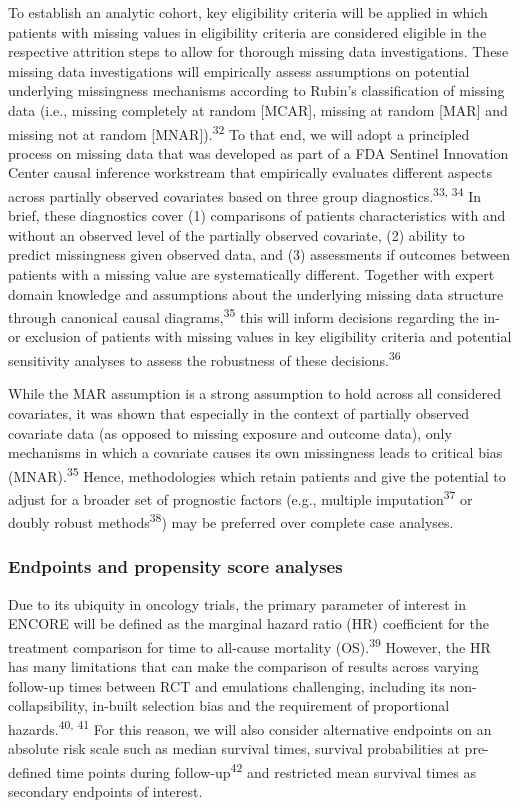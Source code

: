 \documentclass[
  letterpaper,
  DIV=11,
  numbers=noendperiod]{scrartcl}
\begin{document}
To establish an analytic cohort, key eligibility criteria will be
applied in which patients with missing values in eligibility criteria
are considered eligible in the respective attrition steps to allow for
thorough missing data investigations. These missing data investigations
will empirically assess assumptions on potential underlying missingness
mechanisms according to Rubin's classification of missing data (i.e.,
missing completely at random {[}MCAR{]}, missing at random {[}MAR{]} and
missing not at random {[}MNAR{]}).\textsuperscript{32} To that end, we
will adopt a principled process on missing data that was developed as
part of a FDA Sentinel Innovation Center causal inference workstream
that empirically evaluates different aspects across partially observed
covariates based on three group diagnostics.\textsuperscript{33, 34} In
brief, these diagnostics cover (1) comparisons of patients
characteristics with and without an observed level of the partially
observed covariate, (2) ability to predict missingness given observed
data, and (3) assessments if outcomes between patients with a missing
value are systematically different. Together with expert domain
knowledge and assumptions about the underlying missing data structure
through canonical causal diagrams,\textsuperscript{35} this will inform
decisions regarding the in- or exclusion of patients with missing values
in key eligibility criteria and potential sensitivity analyses to assess
the robustness of these decisions.\textsuperscript{36}

While the MAR assumption is a strong assumption to hold across all
considered covariates, it was shown that especially in the context of
partially observed covariate data (as opposed to missing exposure and
outcome data), only mechanisms in which a covariate causes its own
missingness leads to critical bias (MNAR).\textsuperscript{35} Hence,
methodologies which retain patients and give the potential to adjust for
a broader set of prognostic factors (e.g., multiple
imputation\textsuperscript{37} or doubly robust
methods\textsuperscript{38}) may be preferred over complete case
analyses.

\subsubsection{Endpoints and propensity score
analyses}\label{endpoints-and-propensity-score-analyses}

Due to its ubiquity in oncology trials, the primary parameter of
interest in ENCORE will be defined as the marginal hazard ratio (HR)
coefficient for the treatment comparison for time to all-cause mortality
(OS).\textsuperscript{39} However, the HR has many limitations that can
make the comparison of results across varying follow-up times between
RCT and emulations challenging, including its non-collapsibility,
in-built selection bias and the requirement of proportional
hazards.\textsuperscript{40, 41} For this reason, we will also consider
alternative endpoints on an absolute risk scale such as median survival
times, survival probabilities at pre-defined time points during
follow-up\textsuperscript{42} and restricted mean survival times as
secondary endpoints of interest.
\end{document}
